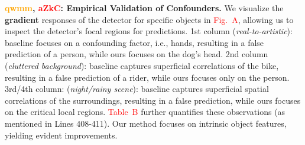 \documentclass[10pt,twocolumn,letterpaper]{article}
\begin{document}


    

\noindent\textbf{\textcolor{orange}{qwmm}, \textcolor{red}{aZkC}: Empirical Validation of Confounders.}
We visualize the \textbf{gradient} responses of the detector for specific objects in
\textcolor{red}{Fig.~A},
allowing us to inspect the detector's focal regions for predictions.
1st column (\textit{real-to-artistic}): baseline focuses on a confounding factor, i.e., hands, resulting in a false prediction of a person, while ours focuses on the dog's head.
2nd column (\textit{cluttered background}): baseline captures superficial correlations of the bike, resulting in a false prediction of a rider, while ours focuses only on the person.
3rd/4th column: (\textit{night/rainy scene}): baseline captures superficial spatial correlations of the surroundings, resulting in a false prediction, while ours focuses on the critical local regions.
\textcolor{red}{Table~B} further quantifies these observations (as mentioned in Lines 408-411). 
Our method focuses on intrinsic object features, yielding evident improvements.
\end{document}
